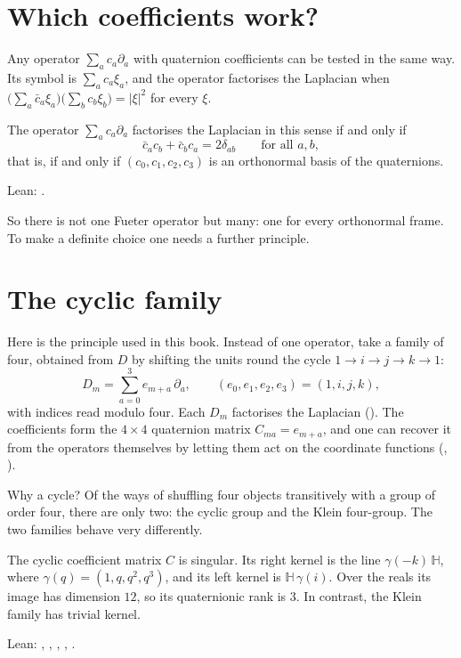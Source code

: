 \section{Which coefficients work?}

Any operator $\sum_a c_a\partial_a$ with quaternion coefficients can be tested in the same way. Its symbol is $\sum_ac_a\xi_a$, and the operator factorises the Laplacian when $\bigl(\sum_a\bar c_a\xi_a\bigr)\bigl(\sum_bc_b\xi_b\bigr)=|\xi|^2$ for every $\xi$.

\begin{proposition}\proved
The operator $\sum_a c_a\partial_a$ factorises the Laplacian in this sense if and only if
\[
\bar c_ac_b+\bar c_bc_a=2\delta_{ab}\qquad\text{for all }a,b,
\]
that is, if and only if $(c_0,c_1,c_2,c_3)$ is an orthonormal basis of the quaternions.
\end{proposition}
\noindent Lean: .

So there is not one Fueter operator but many: one for every orthonormal frame. To make a definite choice one needs a further principle.

\section{The cyclic family}

Here is the principle used in this book. Instead of one operator, take a family of four, obtained from $D$ by shifting the units round the cycle $1\to i\to j\to k\to1$:
\[
D_m=\sum_{a=0}^3 e_{m+a}\,\partial_a,\qquad (e_0,e_1,e_2,e_3)=(1,i,j,k),
\]
with indices read modulo four. Each $D_m$ factorises the Laplacian (). The coefficients form the $4\times4$ quaternion matrix $C_{ma}=e_{m+a}$, and one can recover it from the operators themselves by letting them act on the coordinate functions (, ).

Why a cycle? Of the ways of shuffling four objects transitively with a group of order four, there are only two: the cyclic group and the Klein four-group. The two families behave very differently.

\begin{theorem}\proved\label{thm:cyclic}
The cyclic coefficient matrix $C$ is singular. Its right kernel is the line $\gamma(-k)\,\mathbb H$, where $\gamma(q)=(1,q,q^2,q^3)$, and its left kernel is $\mathbb H\,\gamma(i)$. Over the reals its image has dimension $12$, so its quaternionic rank is $3$. In contrast, the Klein family has trivial kernel.
\end{theorem}
\noindent Lean: , , , , .

